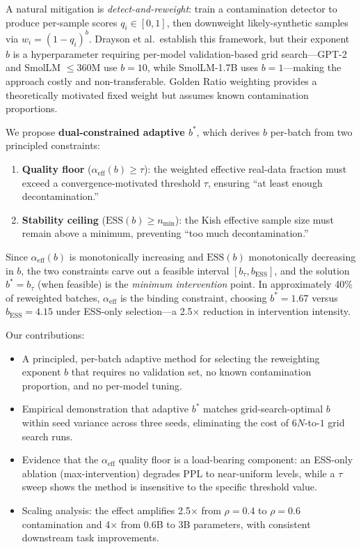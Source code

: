 \documentclass[11pt,a4paper]{article}
\newcommand{\bstar}{b^{*}}
\newcommand{\aeff}{\alpha_{\mathrm{eff}}}
\newcommand{\nmin}{n_{\min}}
\newcommand{\bESS}{b_{\mathrm{ESS}}}
\newcommand{\btau}{b_{\tau}}
\begin{document}
A natural mitigation is \emph{detect-and-reweight}: train a contamination detector to produce per-sample scores $q_i \in [0,1]$, then downweight likely-synthetic samples via $w_i = (1 - q_i)^b$.
Drayson et al.\ establish this framework, but their exponent $b$ is a hyperparameter requiring per-model validation-based grid search---GPT-2 and SmolLM $\leq$360M use $b{=}10$, while SmolLM-1.7B uses $b{=}1$---making the approach costly and non-transferable.
Golden Ratio weighting provides a theoretically motivated fixed weight but assumes known contamination proportions.

We propose \textbf{dual-constrained adaptive $\bstar$}, which derives $b$ per-batch from two principled constraints:
\begin{enumerate}
    \item \textbf{Quality floor} ($\aeff(b) \geq \tau$): the weighted effective real-data fraction must exceed a convergence-motivated threshold $\tau$, ensuring ``at least enough decontamination.''
    \item \textbf{Stability ceiling} ($\mathrm{ESS}(b) \geq \nmin$): the Kish effective sample size must remain above a minimum, preventing ``too much decontamination.''
\end{enumerate}

Since $\aeff(b)$ is monotonically increasing and $\mathrm{ESS}(b)$ monotonically decreasing in $b$, the two constraints carve out a feasible interval $[\btau, \bESS]$, and the solution $\bstar = \btau$ (when feasible) is the \emph{minimum intervention} point.
In approximately 40\% of reweighted batches, $\aeff$ is the binding constraint, choosing $\bstar = 1.67$ versus $\bESS = 4.15$ under ESS-only selection---a 2.5$\times$ reduction in intervention intensity.

Our contributions:
\begin{itemize}
    \item A principled, per-batch adaptive method for selecting the reweighting exponent $b$ that requires no validation set, no known contamination proportion, and no per-model tuning.
    \item Empirical demonstration that adaptive $\bstar$ matches grid-search-optimal $b$ within seed variance across three seeds, eliminating the cost of $6N$-to-$1$ grid search runs.
    \item Evidence that the $\aeff$ quality floor is a load-bearing component: an ESS-only ablation (max-intervention) degrades PPL to near-uniform levels, while a $\tau$ sweep shows the method is insensitive to the specific threshold value.
    \item Scaling analysis: the effect amplifies 2.5$\times$ from $\rho{=}0.4$ to $\rho{=}0.6$ contamination and 4$\times$ from 0.6B to 3B parameters, with consistent downstream task improvements.
\end{itemize}
\end{document}
